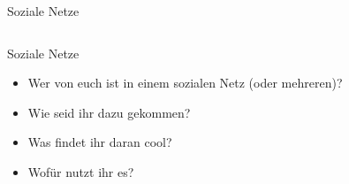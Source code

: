 \begin{frame}{Soziale Netze}
	\begin{columns}
		\begin{center}\end{center}

		\begin{center}\end{center}

		\begin{center}\end{center}

		\begin{center}\end{center}
		\begin{center}\end{center}

		\begin{center}\hspace{2mm}
		\end{center}

		\begin{center}\end{center}

		\begin{center}\end{center}
	\end{columns}
\end{frame}

\begin{frame}{Soziale Netze}
	\begin{itemize}
		\item Wer von euch ist in einem sozialen Netz (oder mehreren)?
		\item Wie seid ihr dazu gekommen?
		\item Was findet ihr daran cool?
		\item Wofür nutzt ihr es?
	\end{itemize}
\end{frame}

